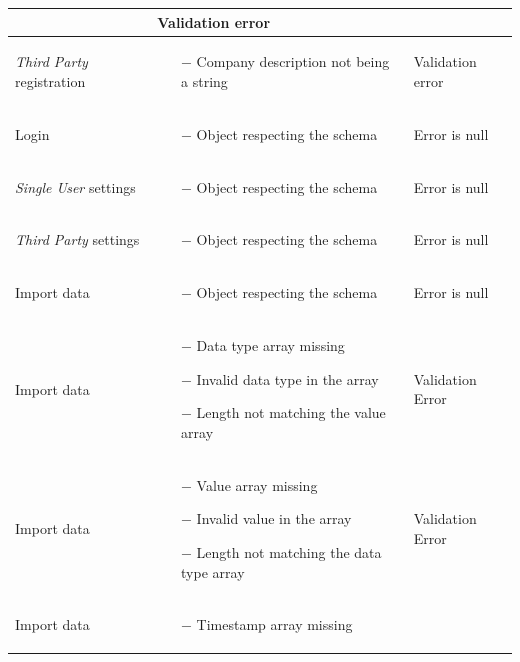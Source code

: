 \documentclass[titlepage]{article}
\begin{document}
\begin{longtable}{| p{3 cm} | p{5 cm} | p{3 cm} |}
		& Validation error \\ \hline
		{\it Third Party} registration & \begin{itemize}[nolistsep]
			\item[$-$] Company description not being a string
		\end{itemize}
		& Validation error \\ \hline
		Login & \begin{itemize}
			\item[$-$] Object respecting the schema
		\end{itemize}
		& Error is null \\ \hline
		{\it Single User} settings & \begin{itemize}[nolistsep]
			\item[$-$] Object respecting the schema
		\end{itemize}
		& Error is null \\ \hline
		{\it Third Party} settings & \begin{itemize}[nolistsep]
			\item[$-$] Object respecting the schema
		\end{itemize}
		& Error is null \\ \hline
		Import data & \begin{itemize}
			\item[$-$] Object respecting the schema
		\end{itemize}
		& Error is null \\ \hline
		Import data & \begin{itemize}[nolistsep]
			\item[$-$] Data type array missing
			\item[$-$] Invalid data type in the array
			\item[$-$] Length not matching the value array
		\end{itemize}
		& Validation Error \\ \hline
		Import data & \begin{itemize}[nolistsep]
			\item[$-$] Value array missing
			\item[$-$] Invalid value in the array
			\item[$-$] Length not matching the data type array
		\end{itemize}
		& Validation Error \\ \hline
		Import data & \begin{itemize}[nolistsep]
			\item[$-$] Timestamp array missing

\end{itemize}
\end{longtable}
\end{document}
